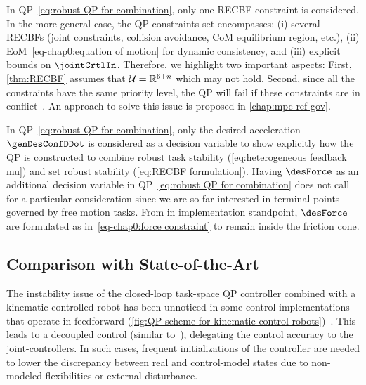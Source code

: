 \begin{remark}\label{rem:decision variables}
	In QP~\eqref{eq:robust QP for combination}, only one RECBF constraint is considered. In the more general case, the QP constraints set encompasses:  (i) several RECBFs (joint constraints, collision avoidance, CoM equilibrium region, etc.), (ii) EoM~\eqref{eq-chap0:equation of motion} for dynamic consistency, and (iii) explicit bounds on $\jointCrtlIn$. Therefore, we highlight two important aspects: First, \cref{thm:RECBF} assumes that ${\cal U}=\mathbb{R}^{6+n}$ which may not hold. Second, since all the constraints have the same  priority level, the QP will fail if these constraints are in conflict~\cite{decre2009icra,rubrecht2010iros,delprete2018ral}. An approach to solve this issue is proposed in \cref{chap:mpc ref gov}.
\end{remark}
\begin{remark}
		In QP~\eqref{eq:robust QP for combination}, only the desired acceleration $\genDesConfDDot$ is considered as a decision variable to show explicitly how the QP is constructed to combine robust task stability (\cref{eq:heterogeneous feedback mu}) and set robust stability (\cref{eq:RECBF formulation}).  Having $\desForce$ as an additional decision variable in QP~\eqref{eq:robust QP for combination} does not call for a particular consideration since we are so far interested in terminal points governed by free motion tasks. From in implementation standpoint, $\desForce$ are formulated as in~\eqref{eq-chap0:force constraint} to remain inside the friction cone.
\end{remark}


\subsection{Comparison with State-of-the-Art}\label{sec-chap2:sota chap2}
The instability issue of the closed-loop task-space QP controller combined with a kinematic-controlled robot has been unnoticed in some control implementations that operate in feedforward (\cref{fig:QP scheme for kinematic-control robots})~\cite{bouyarmane2018tac,zanchettin2017elsevier,polverini2017iros_a,shi2022machines}. This leads to a decoupled control (similar to~\cite{feng2015journalOfFieldRobotics}), delegating the control accuracy to the joint-controllers. In such cases, frequent initializations of the controller are needed to lower the discrepancy between real and control-model states due to non-modeled flexibilities or external disturbance. 


